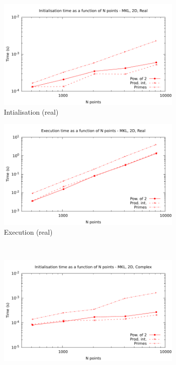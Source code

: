 \documentclass[12pt, a4paper]{article}
\begin{document}
\begin{figure}[H]
\captionsetup{width=0.8\linewidth}
\centering
\begin{subfigure}{.5\textwidth}
\centering
\includegraphics[width=.9\linewidth]{graphs/2d-mkl-init-r.pdf}
\caption{Intialisation (real)}
\label{2DMKLRI}
\end{subfigure}%
\begin{subfigure}{.5\textwidth}
\centering
\includegraphics[width=.9\linewidth]{graphs/2d-mkl-exec-r.pdf}
\caption{Execution (real)}
\label{2DMKLR}
\end{subfigure}\\
\begin{subfigure}{.5\textwidth}
\centering
\includegraphics[width=.9\linewidth]{graphs/2d-mkl-init-c.pdf}

\end{subfigure}
\end{figure}
\end{document}
